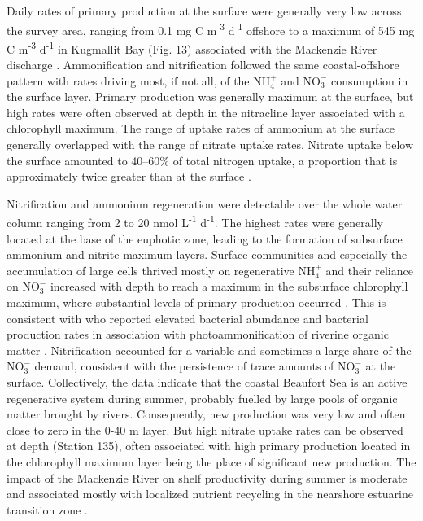 \documentclass[essd, manuscript]{copernicus}
\begin{document}
Daily rates of primary production at the surface were generally very low across the survey area, ranging from 0.1 mg C m\textsuperscript{-3} d\textsuperscript{-1} offshore to a maximum of 545 mg C m\textsuperscript{-3} d\textsuperscript{-1} in Kugmallit Bay (Fig. 13) associated with the Mackenzie River discharge \citep{Tremblay2014}. Ammonification and nitrification followed the same coastal-offshore pattern with rates driving most, if not all, of the $\text{NH}^+_4$ and $\text{NO}^-_3$ consumption in the surface layer. Primary production was generally maximum at the surface, but high rates were often observed at depth in the nitracline layer associated with a chlorophyll maximum. The range of uptake rates of ammonium at the surface generally overlapped with the range of nitrate uptake rates. Nitrate uptake below the surface amounted to 40–60\% of total nitrogen uptake, a proportion that is approximately twice greater than at the surface \citep{Ardyna2017}.

Nitrification and ammonium regeneration were detectable over the whole water column ranging from 2 to 20 nmol L\textsuperscript{-1} d\textsuperscript{-1}. The highest rates were generally located at the base of the euphotic zone, leading to the formation of subsurface ammonium and nitrite maximum layers. Surface communities and especially the accumulation of large cells thrived mostly on regenerative $\text{NH}^+_4$ and their reliance on $\text{NO}^-_3$ increased with depth to reach a maximum in the subsurface chlorophyll maximum, where substantial levels of primary production occurred \citep{Ardyna2017}. This is consistent with \citet{Ortega-Retuerta2012a} who reported elevated bacterial abundance and bacterial production rates in association with photoammonification of riverine organic matter \citep{LeFouest2013}. Nitrification accounted for a variable and sometimes a large share of the $\text{NO}^-_3$ demand, consistent with the persistence of trace amounts of $\text{NO}^-_3$ at the surface. Collectively, the data indicate that the coastal Beaufort Sea is an active regenerative system during summer, probably fuelled by large pools of organic matter brought by rivers. Consequently, new production was very low and often close to zero in the 0-40 m layer. But high nitrate uptake rates can be observed at depth (Station 135), often associated with high primary production located in the chlorophyll maximum layer being the place of significant new production. The impact of the Mackenzie River on shelf productivity during summer is moderate and associated mostly with localized nutrient recycling in the nearshore estuarine transition zone \citep{Tremblay2014}.
\end{document}
